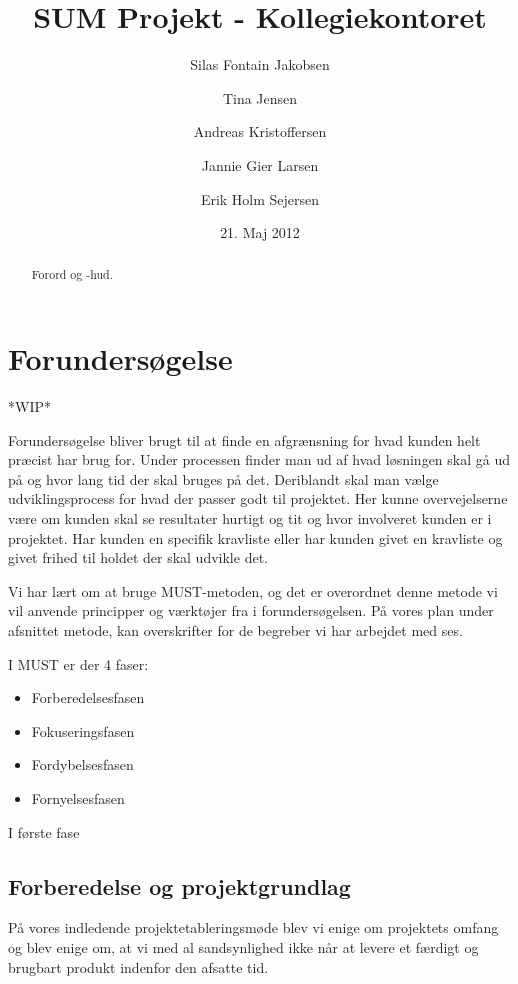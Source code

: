\documentclass[12pt, a4paper]{report}
\title{SUM Projekt - Kollegiekontoret}
\author{Silas Fontain Jakobsen \and Tina Jensen \and Andreas Kristoffersen \and Jannie Gier Larsen \and Erik Holm Sejersen}
\date{21. Maj 2012}
\begin{document}
\begin{titlepage}
\maketitle
\end{titlepage}

\begin{abstract}
\thispagestyle{empty}
Forord og -hud.
\end{abstract}

\tableofcontents

\chapter{Forundersøgelse}

*WIP*

Forundersøgelse bliver brugt til at finde en afgrænsning for hvad kunden helt præcist har brug for. Under processen finder man ud af hvad løsningen skal gå ud på og hvor lang tid der skal bruges på det. Deriblandt skal man vælge udviklingsprocess for hvad der passer godt til projektet. Her kunne overvejelserne være om kunden skal se resultater hurtigt og tit og hvor involveret kunden er i projektet. Har kunden en specifik kravliste eller har kunden givet en kravliste og givet frihed til holdet der skal udvikle det.

Vi har lært om at bruge MUST-metoden, og det er overordnet denne metode vi vil anvende principper og værktøjer fra i forundersøgelsen. På vores plan under afsnittet metode, kan overskrifter for de begreber vi har arbejdet med ses.

I MUST er der 4 faser:
\begin{itemize}
\item Forberedelsesfasen
\item Fokuseringsfasen
\item Fordybelsesfasen
\item Fornyelsesfasen
\end{itemize}

I første fase

\section{Forberedelse og projektgrundlag}
På vores indledende projektetableringsmøde blev vi enige om projektets omfang og blev enige om, at vi med al sandsynlighed ikke når at levere et færdigt og brugbart produkt indenfor den afsatte tid.
\end{document}
